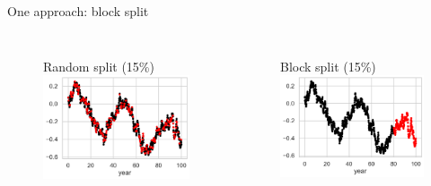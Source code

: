 \documentclass[handout, 10pt]{beamer}
\begin{document}
\begin{frame}{One approach: block split}

\begin{columns}
  \begin{figure}
  \centering
  Random split (15\%)
    \includegraphics[width=\textwidth]{presentation/course-2/figs/leak_ts_random_nopred.png}
    \end{figure}
  \begin{figure}
  \centering
  Block split (15\%)
    \includegraphics[width=\textwidth]{presentation/course-2/figs/leak_ts_block_nopred.png}
    \end{figure}
\end{columns}
\end{frame}
\end{document}
